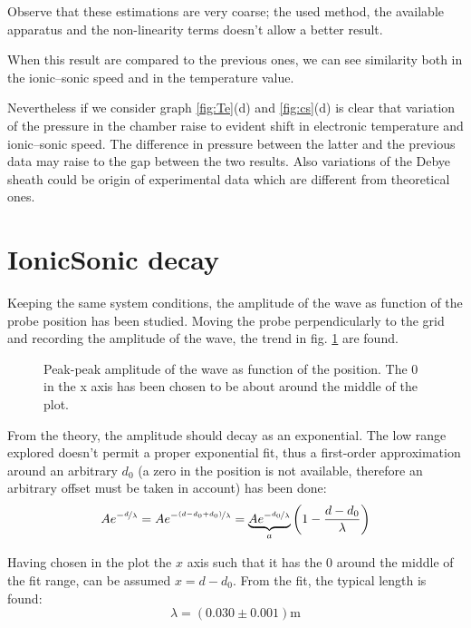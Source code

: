 \documentclass[11pt,a4 paper]{article}
\let\oldfrac\frac
\renewcommand{\frac}[3][d]{\ifthenelse{\equal{#1}{d}}{\oldfrac{#2}{#3}}{\nicefrac{#2}{#3}}}
\begin{document}
Observe that these estimations are very coarse; the used method, the available apparatus and the non-linearity terms doesn't allow a better result.

When this result are compared to the previous ones, we can see similarity both in the ionic--sonic speed and in the temperature value.

Nevertheless if we consider graph \ref{fig:Te}(d) and \ref{fig:cs}(d) is clear that variation of the pressure in the chamber raise to evident shift in electronic temperature and ionic--sonic speed. The difference in pressure between the latter and the previous data may raise to the gap between the two results. Also variations of the Debye sheath could be origin of experimental data which are different from theoretical ones.

\section{IonicSonic decay}
Keeping the same system conditions, the amplitude of the wave as function of the probe position has been studied. Moving the probe perpendicularly to the grid and recording the amplitude of the wave, the trend in fig. \ref{fig:ionicsonic:expdecay} are found.

\begin{figure}[H]
  \centering
  \caption{Peak-peak amplitude of the wave as function of the position. The $0$ in the x axis has been chosen to be about around the middle of the plot.}
  \label{fig:ionicsonic:expdecay}
\end{figure}

From the theory, the amplitude should decay as an exponential. The low range explored doesn't permit a proper exponential fit, thus a first-order approximation around an arbitrary $d_0$ (a zero in the position is not available, therefore an arbitrary offset must be taken in account) has been done:
\begin{equation*}
  Ae^{-\frac[f]{d}{\lambda}} = Ae^{-\frac[f]{(d-d_0+d_0)}{\lambda}} =  \underbrace{Ae^{-\frac[f]{d_0}{\lambda}}}_{a} \left( 1 - \frac{d-d_0}{\lambda}\right)
\end{equation*}

Having chosen in the plot the $x$ axis such that it has the $0$ around the middle of the fit range, can be assumed $x = d-d_0$. From the fit, the typical length is found:
\begin{equation*}
  \lambda = ( 0.030 \pm 0.001 )\si{\metre}
\end{equation*}
\end{document}
